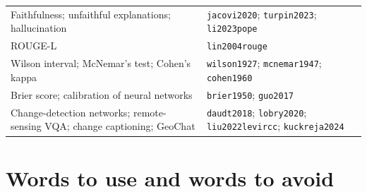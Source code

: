 \begin{longtable}{L{7.6cm}L{6.6cm}}
Faithfulness; unfaithful explanations; hallucination & \texttt{jacovi2020}; \texttt{turpin2023}; \texttt{li2023pope} \\
ROUGE-L & \texttt{lin2004rouge} \\
Wilson interval; McNemar's test; Cohen's kappa & \texttt{wilson1927}; \texttt{mcnemar1947}; \texttt{cohen1960} \\
Brier score; calibration of neural networks & \texttt{brier1950}; \texttt{guo2017} \\
Change-detection networks; remote-sensing VQA; change captioning; GeoChat & \texttt{daudt2018}; \texttt{lobry2020}; \texttt{liu2022levircc}; \texttt{kuckreja2024} \\
\bottomrule
\end{longtable}

\section{Words to use and words to avoid}

